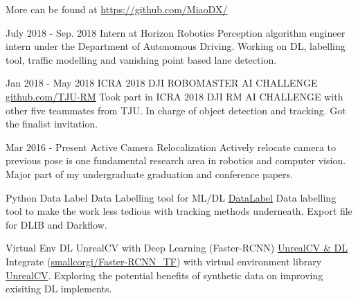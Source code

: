 \documentclass[utf8]{twentysecondcv} %
\begin{document}
\begin{twenty}
    \vspace{-8pt}
    \twentyitem
        {}
        {}        
        {More can be found at \href{https://github.com/MiaoDX/}{https://github.com/MiaoDX/}}
        {}
        {}
        {}
        
    
    \twentyitem
    {July 2018 - }
    {Sep. 2018}
    {Intern at Horizon Robotics}
    {}
    {}
    {Perception algorithm engineer intern under the Department of Autonomous Driving. Working on DL, labelling tool, traffic modelling and vanishing point based lane detection.\vspace{7pt}}
	
          
    \twentyitem
    {Jan 2018 - }
    {May 2018}
    {ICRA 2018 DJI ROBOMASTER AI CHALLENGE}
    {\href{https://github.com/TJU-RM}{github.com/TJU-RM}}
    {}
    {Took part in ICRA 2018 DJI RM AI CHALLENGE with other five teammates from TJU. In charge of object detection and tracking. Got the finalist invitation.}
    
    \twentyitem
    {Mar 2016 -}
    {Present}
    {Active Camera Relocalization}
    {}
    {}
    {Actively relocate camera to previous pose is one fundamental research area in robotics and computer vision. Major part of my undergraduate graduation and conference papers.}
    
	\twentyitem
        {Python}
		{Data Label}
        {Data Labelling tool for ML/DL}
        {\href{https://github.com/MiaoDX/DataLabel}{DataLabel}}
        {}
        {Data labelling tool to make the work less tedious with tracking methods underneath. Export file for DLIB and Darkflow.}
          
    \twentyitem
        {Virtual Env}
      	{DL}
        {UnrealCV with Deep Learning (Faster-RCNN)}
        {\href{https://github.com/MiaoDX/unrealcv_examples/}{UnrealCV \& DL}}
        {}
        {Integrate (\href{https://github.com/smallcorgi/Faster-RCNN\_TF}{smallcorgi/Faster-RCNN\_TF}) with virtual environment library \href{https://github.com/unrealcv/unrealcv}{UnrealCV}. Exploring the potential benefits of synthetic data on improving exisiting DL implements.}
                 
        

\end{twenty}
\end{document}
